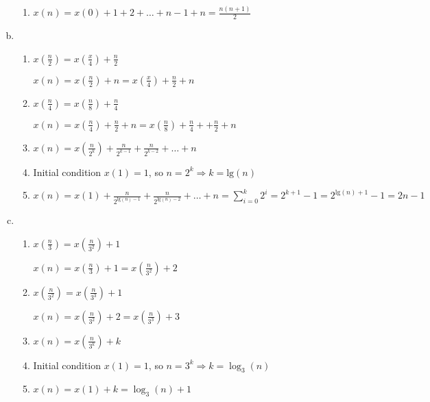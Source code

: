 \documentclass[a4paper,10pt]{article}
\begin{document}
\begin{enumerate}[(a)]
\begin{enumerate}[Step 1.]
	\item $x(n) = x(0) + 1 + 2 + \dots + n-1 + n = \boxed{\frac{n(n+1)}{2}}$
\end{enumerate}

\item \begin{enumerate}[Step 1.]
	\item $x(\frac{n}{2}) = x(\frac{x}{4}) + \frac{n}{2}$
	
	$x(n) = x(\frac{n}{2}) + n = x(\frac{x}{4}) + \frac{n}{2} + n$
	\item $x(\frac{n}{4}) = x(\frac{n}{8}) + \frac{n}{4}$
	
	$x(n) = x(\frac{n}{4}) + \frac{n}{2} + n  = x(\frac{n}{8}) + \frac{n}{4} + + \frac{n}{2} + n$
	\item $x(n) = x(\frac{n}{2^k}) + \frac{n}{2^{k-1}} + \frac{n}{2^{k-2}} + \dots + n$
	
	\item Initial condition $x(1) = 1$, so $n = 2^k \Rightarrow k = \text{lg}(n)$
	
	\item $x(n) = x(1) + \frac{n}{2^{\text{lg}(n) - 1}} +  \frac{n}{2^{\text{lg}(n) - 2}}  + \dots + n = \sum_{i=0}^{k} 2^i = 2^{k+1} - 1 = 2^{\text{lg}(n)+1} - 1 = \boxed{2n-1}$
\end{enumerate}

\item \begin{enumerate}[Step 1.]
	\item $x(\frac{n}{3}) = x(\frac{n}{3^2}) + 1$
	
	$x(n) = x(\frac{n}{3}) + 1 = x(\frac{n}{3^2}) + 2$
	\item $x(\frac{n}{3^2}) = x(\frac{n}{3^3}) + 1$
	
	$x(n) = x(\frac{n}{3^2}) + 2  = x(\frac{n}{3^3}) + 3$
	\item $x(n) = x(\frac{n}{3^k}) + k$
	
	\item Initial condition $x(1) = 1$, so $n = 3^k \Rightarrow k = \log_3(n)$
	
	\item $x(n) = x(1) + k = \boxed{\log_3(n)+1}$
\end{enumerate}
\end{enumerate}
\end{document}
